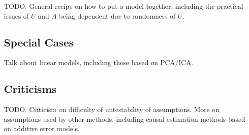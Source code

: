 TODO. General recipe on how to put a model together, including the practical
issues of $U$ and $A$ being dependent due to randomness of $U$.

\subsection{Special Cases}

Talk about linear models, including those based on PCA/ICA.

\subsection{Criticisms}
{}
TODO. Criticism on difficulty of untestability of assumptions.
More on assumptions used by other methods, including causal
estimation methods based on additive error models.